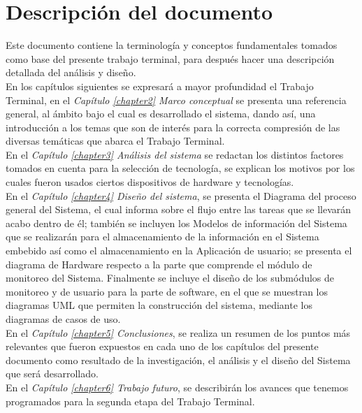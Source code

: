 \section{Descripción del documento}
Este documento contiene la terminología y conceptos fundamentales tomados como base del presente trabajo terminal, para después hacer una descripción detallada del análisis y diseño. 
\\
En los capítulos siguientes se expresará a mayor profundidad el Trabajo Terminal, en el \textit{Capítulo \ref{chapter2} Marco conceptual} se presenta una referencia general, al ámbito bajo el cual es desarrollado el sistema, dando así, una introducción a los temas que son de interés para la correcta compresión de las diversas temáticas que abarca el Trabajo Terminal.
\\
En el \textit{Capítulo \ref{chapter3} Análisis del sistema} se redactan los distintos factores tomados en cuenta para la selección de tecnología, se explican los motivos por los cuales fueron usados ciertos dispositivos de hardware y tecnologías.
\\
En el \textit{Capítulo \ref{chapter4} Diseño del sistema}, se presenta el Diagrama del proceso general del Sistema, el cual informa sobre el flujo entre las tareas que se llevarán acabo dentro de él; también se incluyen los Modelos de información del Sistema que se realizarán para el almacenamiento de la información en el Sistema embebido así como el almacenamiento en la Aplicación de usuario; se presenta el diagrama de Hardware respecto a la parte que comprende el módulo de monitoreo del Sistema. Finalmente se incluye el diseño de los submódulos de monitoreo y de usuario para la parte de software, en el que se muestran los diagramas UML que permiten la construcción del sistema, mediante los diagramas de casos de uso.
\\
En el \textit{Capítulo \ref{chapter5} Conclusiones}, 
se realiza un resumen de los puntos más relevantes que fueron expuestos en cada uno de los capítulos del presente documento como resultado de la investigación, el análisis y el diseño del Sistema que será desarrollado.   
\\
En el \textit{Capítulo \ref{chapter6} Trabajo futuro}, se describirán los avances que tenemos programados para la segunda etapa del Trabajo Terminal.

